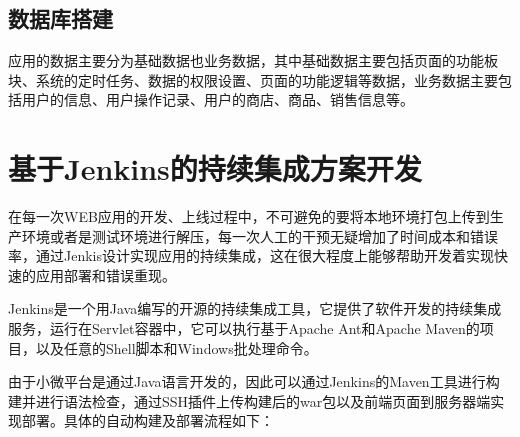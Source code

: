 \subsection{数据库搭建}
应用的数据主要分为基础数据也业务数据，其中基础数据主要包括页面的功能板块、系统的定时任务、数据的权限设置、页面的功能逻辑等数据，业务数据主要包括用户的信息、用户操作记录、用户的商店、商品、销售信息等。
\section{基于Jenkins的持续集成方案开发}
在每一次WEB应用的开发、上线过程中，不可避免的要将本地环境打包上传到生产环境或者是测试环境进行解压，每一次人工的干预无疑增加了时间成本和错误率，通过Jenkis设计实现应用的持续集成，这在很大程度上能够帮助开发着实现快速的应用部署和错误重现\cite{高珺2015以持续集成方式进行系统自动化部署}。

Jenkins是一个用Java编写的开源的持续集成工具，它提供了软件开发的持续集成服务，运行在Servlet容器中，它可以执行基于Apache Ant和Apache Maven的项目，以及任意的Shell脚本和Windows批处理命令\cite{王宁2014基于}。

由于小微平台是通过Java语言开发的，因此可以通过Jenkins的Maven工具进行构建并进行语法检查，通过SSH插件上传构建后的war包以及前端页面到服务器端实现部署\cite{赵亚楠2013基于}。具体的自动构建及部署流程如下：
